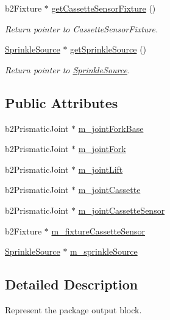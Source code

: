 \begin{DoxyCompactItemize}
b2\-Fixture $\ast$ \hyperlink{classPackageOutput_a63503d10e21d6b77683db0d28fa90e2f}{get\-Cassette\-Sensor\-Fixture} ()
\begin{DoxyCompactList}\small\item\em Return pointer to Cassette\-Sensor\-Fixture. \end{DoxyCompactList}\item 
\hyperlink{classSprinkleSource}{Sprinkle\-Source} $\ast$ \hyperlink{classPackageOutput_a74194c1e25e777b6936f5f6786609aef}{get\-Sprinkle\-Source} ()
\begin{DoxyCompactList}\small\item\em Return pointer to \hyperlink{classSprinkleSource}{Sprinkle\-Source}. \end{DoxyCompactList}\end{DoxyCompactItemize}
\subsection*{Public Attributes}
\begin{DoxyCompactItemize}
\item 
b2\-Prismatic\-Joint $\ast$ \hyperlink{classPackageOutput_a13c8e517356d405fcc3761dbf5297243}{m\-\_\-joint\-Fork\-Base}
\item 
b2\-Prismatic\-Joint $\ast$ \hyperlink{classPackageOutput_acf132fdef37105ce91af9fedab94969a}{m\-\_\-joint\-Fork}
\item 
b2\-Prismatic\-Joint $\ast$ \hyperlink{classPackageOutput_a10725b3931a327ca8cad5527d65dadc5}{m\-\_\-joint\-Lift}
\item 
b2\-Prismatic\-Joint $\ast$ \hyperlink{classPackageOutput_ac5b706bf7b0394579afaa66fa416bdc8}{m\-\_\-joint\-Cassette}
\item 
b2\-Prismatic\-Joint $\ast$ \hyperlink{classPackageOutput_ad7fd83bf723bc703b88a2cb18b3b8258}{m\-\_\-joint\-Cassette\-Sensor}
\item 
b2\-Fixture $\ast$ \hyperlink{classPackageOutput_a707dc7e298abe79485a24b7cd5fe3a26}{m\-\_\-fixture\-Cassette\-Sensor}
\item 
\hyperlink{classSprinkleSource}{Sprinkle\-Source} $\ast$ \hyperlink{classPackageOutput_a920a0cd21450d4c9e0330e72064970ac}{m\-\_\-sprinkle\-Source}
\end{DoxyCompactItemize}


\subsection{Detailed Description}
Represent the package output block. 

